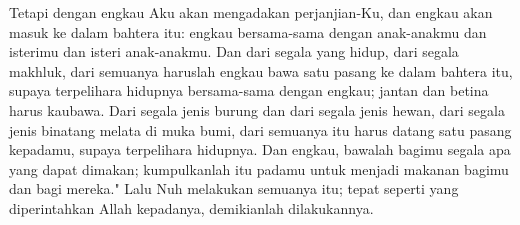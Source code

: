 \begin{biblechapter}
\verse Tetapi dengan engkau Aku akan mengadakan perjanjian-Ku, dan engkau akan masuk ke dalam bahtera itu: engkau bersama-sama dengan anak-anakmu dan isterimu dan isteri anak-anakmu.
\verse Dan dari segala yang hidup, dari segala makhluk, dari semuanya haruslah engkau bawa satu pasang ke dalam bahtera itu, supaya terpelihara hidupnya bersama-sama dengan engkau; jantan dan betina harus kaubawa.
\verse Dari segala jenis burung dan dari segala jenis hewan, dari segala jenis binatang melata di muka bumi, dari semuanya itu harus datang satu pasang kepadamu, supaya terpelihara hidupnya.
\verse Dan engkau, bawalah bagimu segala apa yang dapat dimakan; kumpulkanlah itu padamu untuk menjadi makanan bagimu dan bagi mereka."
\verse Lalu Nuh melakukan semuanya itu; tepat seperti yang diperintahkan Allah kepadanya, demikianlah dilakukannya.
\end{biblechapter}

